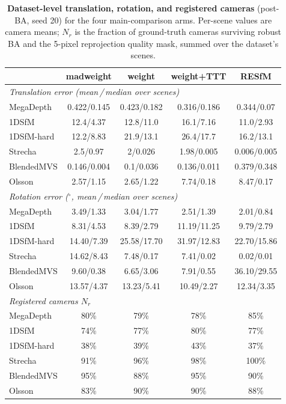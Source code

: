 \documentclass[10pt,twocolumn,letterpaper]{article}
\renewcommand{\deg}{^{\circ}}
\begin{document}
\begin{table}[t]\centering\footnotesize
\caption{\textbf{Dataset-level translation, rotation, and registered cameras} (post-BA,
seed 20) for the four main-comparison arms. Per-scene values are camera means; $N_r$
is the fraction of ground-truth cameras surviving robust BA and the 5-pixel reprojection
quality mask, summed over the dataset's scenes.}
\label{tab:supp_fullmetrics}
\setlength{\tabcolsep}{4pt}%
\begin{tabular}{lcccc}
\toprule
 & madweight & weight & weight+TTT & RESfM\\
\midrule
\multicolumn{5}{l}{\emph{Translation error (mean\,/\,median over scenes)}}\\[1pt]
MegaDepth & 0.422/0.145 & 0.423/0.182 & 0.316/0.186 & 0.344/0.07\\
1DSfM & 12.4/4.37 & 12.8/11.0 & 16.1/7.16 & 11.0/2.93\\
1DSfM-hard & 12.2/8.83 & 21.9/13.1 & 26.4/17.7 & 16.2/13.1\\
Strecha & 2.5/0.97 & 2/0.026 & 1.98/0.005 & 0.006/0.005\\
BlendedMVS & 0.146/0.004 & 0.1/0.036 & 0.136/0.011 & 0.379/0.348\\
Olsson & 2.57/1.15 & 2.65/1.22 & 7.74/0.18 & 8.47/0.17\\
\midrule
\multicolumn{5}{l}{\emph{Rotation error ($\deg$, mean\,/\,median over scenes)}}\\[1pt]
MegaDepth & 3.49/1.33 & 3.04/1.77 & 2.51/1.39 & 2.01/0.84\\
1DSfM & 8.31/4.53 & 8.39/2.79 & 11.19/11.25 & 9.79/2.79\\
1DSfM-hard & 14.40/7.39 & 25.58/17.70 & 31.97/12.83 & 22.70/15.86\\
Strecha & 14.62/8.43 & 7.48/0.17 & 7.41/0.02 & 0.02/0.01\\
BlendedMVS & 9.60/0.38 & 6.65/3.06 & 7.91/0.55 & 36.10/29.55\\
Olsson & 13.57/4.37 & 13.23/5.41 & 10.49/2.27 & 12.34/3.35\\
\midrule
\multicolumn{5}{l}{\emph{Registered cameras $N_r$}}\\[1pt]
MegaDepth & 80\% & 79\% & 78\% & 85\%\\
1DSfM & 74\% & 77\% & 80\% & 77\%\\
1DSfM-hard & 38\% & 39\% & 43\% & 37\%\\
Strecha & 91\% & 96\% & 98\% & 100\%\\
BlendedMVS & 95\% & 88\% & 95\% & 90\%\\
Olsson & 83\% & 90\% & 90\% & 88\%\\
\bottomrule
\end{tabular}
\end{table}
\end{document}

